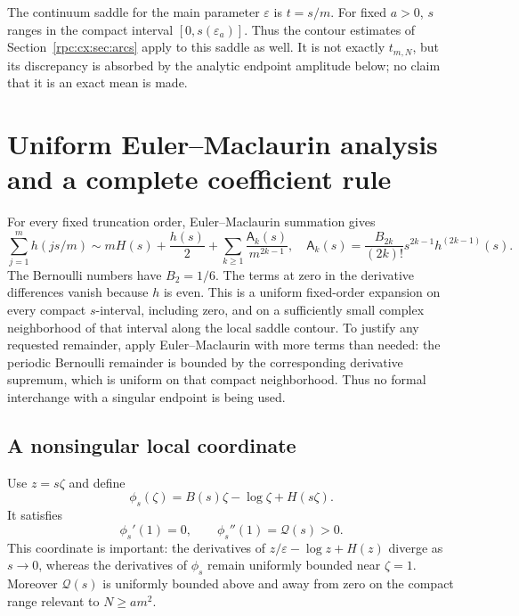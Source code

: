 \documentclass[11pt]{article}
\theoremstyle{definition}
\theoremstyle{remark}
\numberwithin{equation}{section}
\begin{document}
The continuum saddle for the main parameter $\varepsilon$ is $t=s/m$.
For fixed $a>0$, $s$ ranges in the compact interval
$[0,s(\varepsilon_a)]$. Thus the contour estimates of
Section~\ref{rpc:cx:sec:arcs} apply to this saddle as well. It is not exactly
$t_{m,N}$, but its discrepancy is absorbed by the analytic endpoint
amplitude below; no claim that it is an exact mean is made.

\section{Uniform Euler--Maclaurin analysis and a complete coefficient rule}
\label{rpc:cx:sec:em}
For every fixed truncation order, Euler--Maclaurin summation gives
\begin{equation}\label{rpc:cx:eq:EM}
 \sum_{j=1}^m h(js/m)
 \sim mH(s)+\frac{h(s)}2+
 \sum_{k\ge1}\frac{\mathsf A_k(s)}{m^{2k-1}},
 \quad
 \mathsf A_k(s)=\frac{B_{2k}}{(2k)!}s^{2k-1}h^{(2k-1)}(s).
\end{equation}
The Bernoulli numbers have $B_2=1/6$.
The terms at zero in the derivative differences vanish because $h$ is
even. This is a uniform fixed-order expansion on every compact
$s$-interval, including zero, and on a sufficiently small complex
neighborhood of that interval along the local saddle contour.
To justify any requested remainder, apply Euler--Maclaurin with more
terms than needed: the periodic Bernoulli remainder is bounded by the
corresponding derivative supremum, which is uniform on that compact
neighborhood. Thus no formal interchange with a singular endpoint is
being used.

\subsection{A nonsingular local coordinate}
Use $z=s\zeta$ and define
\begin{equation}\label{rpc:cx:eq:phase}
 \phi_s(\zeta)=B(s)\zeta-\log \zeta+H(s\zeta).
\end{equation}
It satisfies
\begin{equation}
 \phi_s'(1)=0,\qquad \phi_s''(1)=\mathcal Q(s)>0.
\end{equation}
This coordinate is important: the derivatives of
$z/\varepsilon-\log z+H(z)$ diverge as $s\to0$, whereas the derivatives of
$\phi_s$ remain uniformly bounded near $\zeta=1$.
Moreover $\mathcal Q(s)$ is uniformly bounded above and away from zero on the
compact range relevant to $N\ge am^2$.
\end{document}
